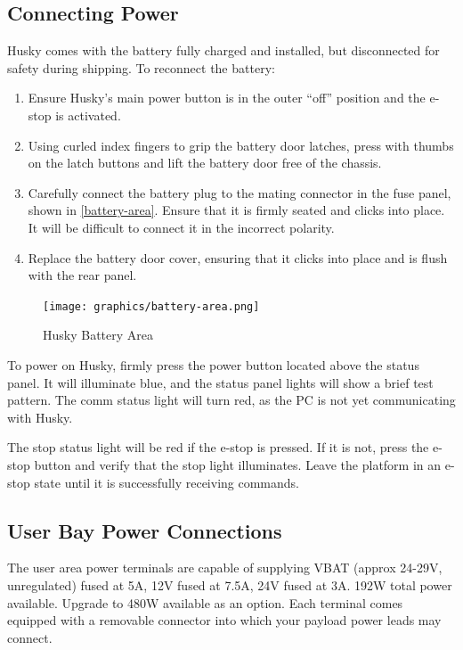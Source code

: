 \documentclass[]{clearpath-latex/clearpath-manual}
\begin{document}
\newpage

\subsection{Connecting Power}
Husky comes with the battery fully charged and installed, but disconnected for safety during shipping.
To reconnect the battery:

\begin{enumerate}
	\item Ensure Husky’s main power button is in the outer “off” position and the e-stop is activated.
	\item Using curled index fingers to grip the battery door latches, press with thumbs on the latch buttons and lift the battery door free of the chassis.
	\item Carefully connect the battery plug to the mating connector in the fuse panel, shown in \autoref{battery-area}. Ensure that it is firmly seated and clicks into place. It will be difficult to connect it in the incorrect polarity.
	\item Replace the battery door cover, ensuring that it clicks into place and is flush with the rear panel.
\end{enumerate}

\begin{figure}[h]
	\centering
	\texttt{[image: graphics/battery-area.png]}
	\caption{Husky Battery Area}
	\label{battery-area}
\end{figure}

To power on Husky, firmly press the power button located above the status panel. It will illuminate blue, and the
status panel lights will show a brief test pattern. The comm status light will turn red, as the PC is not yet
communicating with Husky.

The stop status light will be red if the e-stop is pressed. If it is not, press the e-stop button and
verify that the stop light illuminates. Leave the platform in an e-stop state until it is successfully receiving commands.

\subsection{User Bay Power Connections}
The user area power terminals are capable of supplying VBAT (approx 24-29V, unregulated) fused at 5A, 12V fused at 7.5A,
24V fused at 3A. 192W total power available. Upgrade to 480W available as an option. Each terminal comes equipped with a
removable connector into which your payload power leads may connect.
\end{document}
